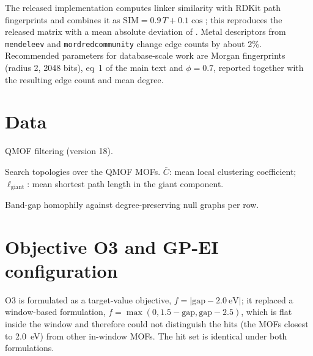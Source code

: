 \documentclass[journal=jcisd8,manuscript=suppinfo]{achemso}
\begin{document}
The released implementation computes linker similarity with RDKit path fingerprints and combines it as $\mathrm{SIM}=0.9\,T+0.1\cos$; this reproduces the released matrix with a mean absolute deviation of \reproMae{}. Metal descriptors from \texttt{mendeleev} and \texttt{mordredcommunity} change edge counts by about 2\%. Recommended parameters for database-scale work are Morgan fingerprints (radius 2, 2048 bits), eq~1 of the main text and $\phi=0.7$, reported together with the resulting edge count and mean degree.

\section{Data}

\begin{table}[h]
\caption{QMOF filtering (version 18).}
\label{tab:filters}
\small

\end{table}

\begin{table}[h]
\caption{Search topologies over the \nPool{} QMOF MOFs. $\bar C$: mean local clustering coefficient; $\ell_{\mathrm{giant}}$: mean shortest path length in the giant component.}
\label{tab:graphs}
\scriptsize
\begin{adjustbox}{max width=\linewidth}\end{adjustbox}
\end{table}

\begin{table}[h]
\caption{Band-gap homophily against \homNrand{} degree-preserving null graphs per row.}
\label{tab:homophily}
\scriptsize
\begin{adjustbox}{max width=\linewidth}\end{adjustbox}
\end{table}

\section{Objective O3 and GP-EI configuration}
O3 is formulated as a target-value objective, $f=|\mathrm{gap}-2.0\ \mathrm{eV}|$; it replaced a window-based formulation, $f=\max(0,1.5-\mathrm{gap},\mathrm{gap}-2.5)$, which is flat inside the window and therefore could not distinguish the hits (the MOFs closest to 2.0~eV) from other in-window MOFs. The hit set is identical under both formulations.
\end{document}

